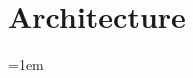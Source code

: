 \documentclass[12pt]{report}
\begin{document}
\section{Architecture}\label{sec:ModelArchitecture}





\emergencystretch=1em
\printbibliography


\end{document}
